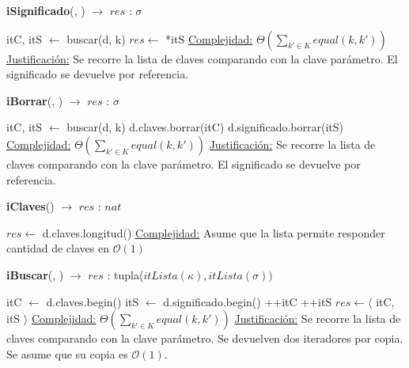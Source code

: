 \documentclass[a4paper,10pt]{article}
\begin{document}
\begin{Algoritmos}
\begin{algorithm}[H]{\textbf{iSignificado}(, )
    $\to$ $res$ : $\sigma$}
\begin{algorithmic}
    \State itC, itS $\gets$ buscar(d, k)
    \State $res \gets$ *itS
    \Statex \underline{Complejidad:} $\Theta(\sum_{k' \in K}equal(k,k'))$
    \Statex \underline{Justificación:} Se recorre la lista de claves comparando
    con la clave parámetro. El significado se devuelve por referencia.
\end{algorithmic}
\end{algorithm}

\begin{algorithm}[H]{\textbf{iBorrar}(, )
    $\to$ $res$ : $\sigma$}
\begin{algorithmic}
    \State itC, itS $\gets$ buscar(d, k)
    \State d.claves.borrar(itC)
    \State d.significado.borrar(itS)
    \Statex \underline{Complejidad:} $\Theta(\sum_{k' \in K}equal(k,k'))$
    \Statex \underline{Justificación:} Se recorre la lista de claves comparando
    con la clave parámetro. El significado se devuelve por referencia.
\end{algorithmic}
\end{algorithm}

\begin{algorithm}[H]{\textbf{iClaves}() $\to$ $res$ : $nat$}
\begin{algorithmic}
    \State $res \gets$ d.claves.longitud()
    \Statex \underline{Complejidad:} Asume que la lista permite responder
    cantidad de claves en $\mathcal{O}(1)$
\end{algorithmic}
\end{algorithm}

\begin{algorithm}[H]{\textbf{iBuscar}(, )
    $\to$ $res$ : tupla($itLista(\kappa), itLista(\sigma))$}
\begin{algorithmic}
    \State itC $\gets$ d.claves.begin()
    \State itS $\gets$ d.significado.begin()
        \State ++itC
        \State ++itS
    \EndWhile
    \State $res \gets \langle$ itC, itS $\rangle$
    \Statex \underline{Complejidad:} $\Theta(\sum_{k' \in K}equal(k,k'))$
    \Statex \underline{Justificación:} Se recorre la lista de claves comparando
    con la clave parámetro. Se devuelven dos iteradores por copia. Se asume que
    su copia es $\mathcal{O}(1)$.
\end{algorithmic}
\end{algorithm}
  
\end{Algoritmos}
\end{document}

